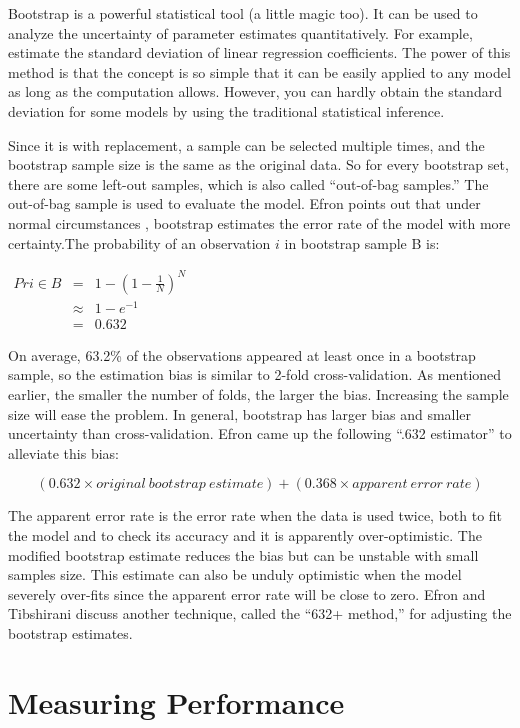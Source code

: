 \documentclass[
  12pt,
]{krantz}
\begin{document}
Bootstrap is a powerful statistical tool (a little magic too). It can be used to analyze the uncertainty of parameter estimates \citep{bootstrap1986} quantitatively. For example, estimate the standard deviation of linear regression coefficients. The power of this method is that the concept is so simple that it can be easily applied to any model as long as the computation allows. However, you can hardly obtain the standard deviation for some models by using the traditional statistical inference.

Since it is with replacement, a sample can be selected multiple times, and the bootstrap sample size is the same as the original data. So for every bootstrap set, there are some left-out samples, which is also called ``out-of-bag samples.'' The out-of-bag sample is used to evaluate the model. Efron points out that under normal circumstances \citep{efron1983}, bootstrap estimates the error rate of the model with more certainty.The probability of an observation \(i\) in bootstrap sample B is:

\(\begin{array}{ccc} Pr{i\in B} & = & 1-\left(1-\frac{1}{N}\right)^{N}\\  & \approx & 1-e^{-1}\\  & = & 0.632 \end{array}\)

On average, 63.2\% of the observations appeared at least once in a bootstrap sample, so the estimation bias is similar to 2-fold cross-validation. As mentioned earlier, the smaller the number of folds, the larger the bias. Increasing the sample size will ease the problem. In general, bootstrap has larger bias and smaller uncertainty than cross-validation. Efron came up the following ``.632 estimator'' to alleviate this bias:

\[(0.632 × original\ bootstrap\ estimate) + (0.368 × apparent\ error\ rate)\]

The apparent error rate is the error rate when the data is used twice, both to fit the model and to check its accuracy and it is apparently over-optimistic. The modified bootstrap estimate reduces the bias but can be unstable with small samples size. This estimate can also be unduly optimistic when the model severely over-fits since the apparent error rate will be close to zero. Efron and Tibshirani \citep{b632plus} discuss another technique, called the ``632+ method,'' for adjusting the bootstrap estimates.

\hypertarget{measuring-performance}{%
\chapter{Measuring Performance}\label{measuring-performance}}
\end{document}

